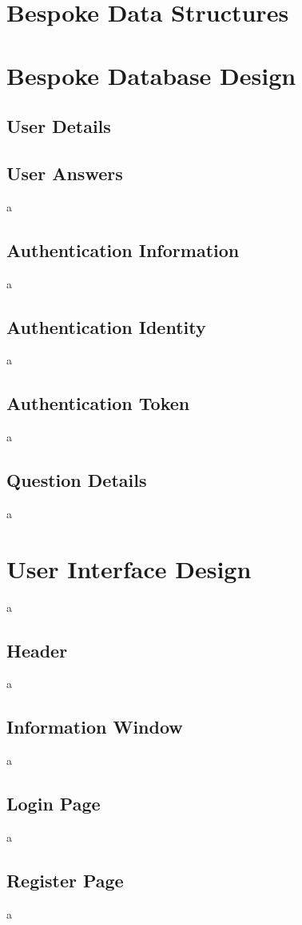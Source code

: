 \section{Bespoke Data Structures}

\section{Bespoke Database Design}
\subsection{User Details}

\subsection{User Answers}
a
\subsection{Authentication Information}
a
\subsection{Authentication Identity}
a
\subsection{Authentication Token}
a
\subsection{Question Details}
a

\section{User Interface Design}
a
\subsection{Header}
a
\subsection{Information Window}
a
\subsection{Login Page}
a
\subsection{Register Page}
a

